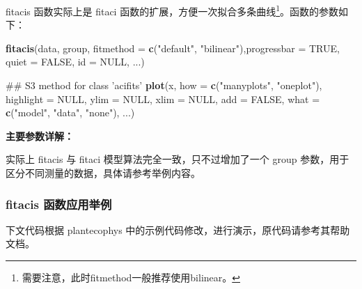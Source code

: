 \documentclass[]{krantz}
\makeatletter
\newenvironment{Shaded}{\begin{snugshade}}{\end{snugshade}}
\newcommand{\KeywordTok}[1]{\textcolor[rgb]{0.13,0.29,0.53}{\textbf{#1}}}
\newcommand{\DataTypeTok}[1]{\textcolor[rgb]{0.13,0.29,0.53}{#1}}
\newcommand{\DecValTok}[1]{\textcolor[rgb]{0.00,0.00,0.81}{#1}}
\newcommand{\StringTok}[1]{\textcolor[rgb]{0.31,0.60,0.02}{#1}}
\newcommand{\CommentTok}[1]{\textcolor[rgb]{0.56,0.35,0.01}{\textit{#1}}}
\newcommand{\OtherTok}[1]{\textcolor[rgb]{0.56,0.35,0.01}{#1}}
\newcommand{\OperatorTok}[1]{\textcolor[rgb]{0.81,0.36,0.00}{\textbf{#1}}}
\newcommand{\NormalTok}[1]{#1}
\newenvironment{kframe}{%
\medskip{}
\setlength{\fboxsep}{.8em}
 \def\at@end@of@kframe{}%
 \ifinner\ifhmode%
  \def\at@end@of@kframe{\end{minipage}}%
  \begin{minipage}{\columnwidth}%
 \fi\fi%
 \def\FrameCommand##1{\hskip\@totalleftmargin \hskip-\fboxsep
 \colorbox{shadecolor}{##1}\hskip-\fboxsep
     \hskip-\linewidth \hskip-\@totalleftmargin \hskip\columnwidth}%
 \MakeFramed {\advance\hsize-\width
   \@totalleftmargin\z@ \linewidth\hsize
   \@setminipage}}%
 {\par\unskip\endMakeFramed%
 \at@end@of@kframe}
\renewenvironment{Shaded}{\begin{kframe}}{\end{kframe}}
\theoremstyle{definition}
\theoremstyle{definition}
\theoremstyle{definition}
\theoremstyle{remark}
\makeatother
\begin{document}
fitacis 函数实际上是 fitaci 函数的扩展，方便一次拟合多条曲线\footnote{需要注意，此时fitmethod一般推荐使用bilinear。}。函数的参数如下：

\begin{Shaded}
\begin{Highlighting}[]
\KeywordTok{fitacis}\NormalTok{(data, group, }\DataTypeTok{fitmethod =} \KeywordTok{c}\NormalTok{(}\StringTok{"default"}\NormalTok{, }
        \StringTok{"bilinear"}\NormalTok{),}\DataTypeTok{progressbar =} \OtherTok{TRUE}\NormalTok{, }
        \DataTypeTok{quiet =} \OtherTok{FALSE}\NormalTok{, }\DataTypeTok{id =} \OtherTok{NULL}\NormalTok{, ...)}

\NormalTok{## S3 method for class 'acifits'}
\KeywordTok{plot}\NormalTok{(x, }\DataTypeTok{how =} \KeywordTok{c}\NormalTok{(}\StringTok{"manyplots"}\NormalTok{, }\StringTok{"oneplot"}\NormalTok{), }
     \DataTypeTok{highlight =} \OtherTok{NULL}\NormalTok{, }\DataTypeTok{ylim =} \OtherTok{NULL}\NormalTok{, }
     \DataTypeTok{xlim =} \OtherTok{NULL}\NormalTok{, }\DataTypeTok{add =} \OtherTok{FALSE}\NormalTok{, }\DataTypeTok{what =} \KeywordTok{c}\NormalTok{(}\StringTok{"model"}\NormalTok{,}
     \StringTok{"data"}\NormalTok{, }\StringTok{"none"}\NormalTok{), ...)}
\end{Highlighting}
\end{Shaded}

\textbf{主要参数详解：}

实际上 fitacis 与 fitaci 模型算法完全一致，只不过增加了一个 group
参数，用于区分不同测量的数据，具体请参考举例内容。

\subsubsection{fitacis 函数应用举例}\label{fitacis_exa}

下文代码根据 plantecophys
中的示例代码修改，进行演示，原代码请参考其帮助文档。

\begin{Shaded}
\end{Shaded}
\end{document}
